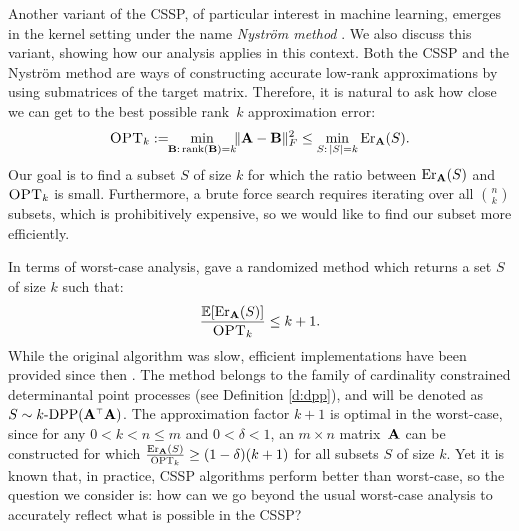 \documentclass{article}
\begin{document}
Another variant of the CSSP, of particular interest in machine learning, emerges in the kernel
setting under the name \emph{Nystr\"om method}
\citep{Williams01Nystrom,dm_kernel_JRNL,revisiting-nystrom}. We also
discuss this variant, showing how our analysis applies in this context.
Both the CSSP and the Nystr\"om method are ways of
constructing accurate low-rank approximations by using submatrices of
the target matrix. Therefore, it is natural to ask how
close we can get to the best possible rank~$k$ approximation error:
\begin{align*}
  {\textsc{OPT}_k} := \!\!\min_{\mathbf B:\,\mathrm{rank}(\mathbf B)=k} \!\!\|\mathbf A-\mathbf B\|_F^2\leq \min_{S:\,|S|=k}\mathrm{Er}_\mathbf A(S).
\end{align*}
Our goal is to find a subset $S$ of size $k$ for which the ratio
between $\mathrm{Er}_\mathbf A(S)$ and ${\textsc{OPT}_k}$ is small. Furthermore, a brute force
search requires iterating over all 
${n \choose k}$ subsets, which is prohibitively expensive, so we
would like to find our subset more efficiently. %

In terms of worst-case analysis, 
\citet{pca-volume-sampling} gave a randomized
method %
which returns a
set $S$ of size $k$ such that:
\begin{align}
  \frac{\mathbb E[\mathrm{Er}_\mathbf A(S)]}{{\textsc{OPT}_k}}\leq k+1.\label{eq:old-bound}
\end{align}
While the original algorithm was slow, 
efficient implementations have been provided since then
\citep[e.g., see][]{efficient-volume-sampling}.
The method belongs to the family of cardinality constrained
determinantal point processes (see Definition \ref{d:dpp}), and will
be denoted as $S\sim k\text{-}\DPP(\A^\top\A)$. 
The approximation  factor  $k+1$ is optimal in the worst-case,
since for any $0<k<n\leq m$ and $0<\delta<1$, an $m\times n$
matrix~$\mathbf A$ can be constructed for which $\frac{\mathrm{Er}_{\mathbf A}(S)}{{\textsc{OPT}_k}}\geq
(1-\delta)(k+1)$ for all subsets $S$ of size $k$. 
Yet it is known that, in practice, CSSP algorithms perform better
than worst-case, so the question we consider is: how can we go beyond
the usual worst-case analysis to accurately reflect what is possible
in the CSSP?  
\end{document}
